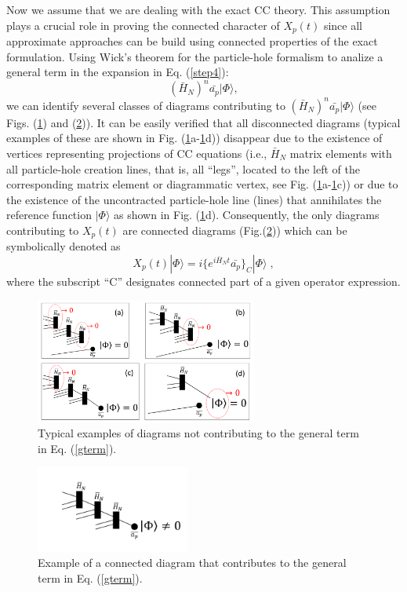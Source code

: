 \documentclass[aps,prb,preprint,groupaddress,floatfix]{revtex4}
\begin{document}
Now we assume that we are dealing with the exact CC theory. This assumption
plays a crucial role in proving the connected character of $X_p(t)$ since all
approximate approaches can be build using connected properties of the exact 
formulation. Using Wick's theorem for the particle-hole formalism to analize a general term in the expansion in Eq. (\ref{step4}):
\begin{equation}
(\bar{H}_N)^n \bar{a_p} |\Phi\rangle,
\label{gterm}
\end{equation}
we can identify several classes of diagrams contributing to $(\bar{H}_N)^n
\bar{a_p} |\Phi\rangle$ (see Figs. (\ref{fig2_conn}) and (\ref{fig3_conn})). It can be easily verified that all disconnected diagrams (typical examples of
these are shown in Fig. (\ref{fig2_conn}a-\ref{fig2_conn}d)) disappear due
to the existence of vertices representing projections of CC equations (i.e., $\bar{H}_N$ matrix elements with all particle-hole creation lines,
that is, all ``legs'', located to the left of the corresponding matrix element or diagrammatic vertex, see Fig. (\ref{fig2_conn}a-\ref{fig2_conn}c)) or due to the existence of the uncontracted particle-hole line (lines) that annihilates the reference function $|\Phi\rangle$ as shown in Fig. (\ref{fig2_conn}d). Consequently, the only diagrams contributing to $X_p(t)$ are connected diagrams
(Fig.(\ref{fig3_conn})) which can be symbolically denoted as 
\begin{equation}
X_p(t)|\Phi\rangle = i
\lbrace e^{i\bar{H}_Nt }\bar{a_p} \rbrace_C |\Phi\rangle\;,
\label{connxp}
\end{equation}
where the subscript ``C'' designates connected part of a given operator expression. 
%
%
\begin{figure}
\includegraphics[trim= 0.0in 0.5in 0.0in 0.0in, width=0.65\textwidth]{Fig01-SI.pdf}
\caption{Typical examples of diagrams not contributing to the general term in Eq. (\ref{gterm}).}
\label{fig2_conn}
\end{figure}
%
\begin{figure}
\includegraphics[trim= 0.0in 2.0in 0.0in 1.0in, width=0.45\textwidth]{Fig02-SI.pdf}
\caption{Example of a connected diagram that contributes to the general term in Eq. (\ref{gterm}).}
\label{fig3_conn}
\end{figure}
%
\end{document}
